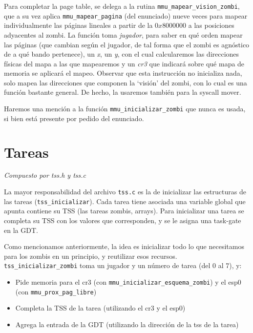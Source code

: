 \documentclass{article}
\begin{document}
	Para completar la page table, se delega a la rutina \texttt{mmu\_mapear\_vision\_zombi}, que a su vez aplica \texttt{mmu\_mapear\_pagina} (del enunciado) nueve veces para mapear individualmente las páginas lineales a partir de la $0x8000000$ a las posiciones adyacentes al zombi. La función toma \textit{jugador}, para saber en qué orden mapear las páginas (que cambian según el jugador, de tal forma que el zombi es agnóstico de a qué bando pertenece), un \textit{x}, un \textit{y}, con el cual calcularemos las direcciones físicas del mapa a las que mapearemos y un \textit{cr3} que indicará sobre qué mapa de memoria se aplicará el mapeo. Observar que esta instrucción no inicializa nada, solo mapea las direcciones que componen la `visión' del zombi, con lo cual es una función bastante general. De hecho, la usaremos también para la syscall mover.

	Haremos una mención a la función \texttt{mmu\_inicializar\_zombi} que nunca es usada, si bien está presente por pedido del enunciado. 


	\section{Tareas}
	\vspace{-1cm}
	\begin{flushright}
	\textit{Compuesto por tss.h y tss.c}
	\end{flushright}

	La mayor responsabilidad del archivo \texttt{tss.c} es la de inicializar las estructuras de las tareas (\texttt{tss\_inicializar}). Cada tarea tiene asociada una variable global que apunta  contiene su TSS (las tareas zombis, arrays). Para inicializar una tarea se completa su TSS con los valores que corresponden, y se le asigna una task-gate en la GDT.

	Como mencionamos anteriormente, la idea es inicializar todo lo que necesitamos para los zombis en un principio, y reutilizar esos recursos. \texttt{tss\_inicializar\_zombi} toma un jugador y un número de tarea (del 0 al 7), y:

	\begin{itemize}[topsep=0pt]
		\item Pide memoria para el cr3 (con \texttt{mmu\_inicializar\_esquema\_zombi}) y el esp0 (con \texttt{mmu\_prox\_pag\_libre})
		\item Completa la TSS de la tarea (utilizando el cr3 y el esp0)
		\item Agrega la entrada de la GDT (utilizando la dirección de la tss de la tarea)
	\end{itemize}
\end{document}
